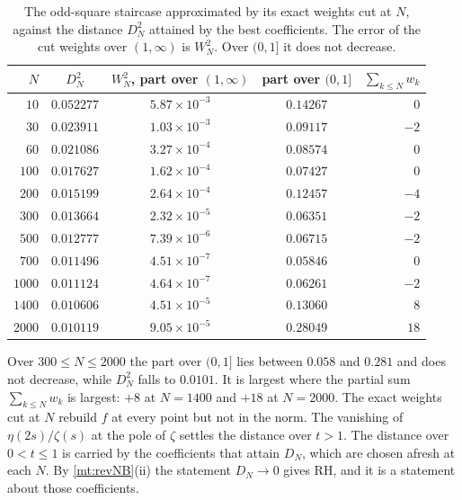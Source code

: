 \documentclass[11pt]{article}
\theoremstyle{definition}\newtheorem{definition}[theorem]{Definition}
\theoremstyle{remark}\newtheorem{remark}[theorem]{Remark}
\theoremstyle{definition}\newtheorem{axiom}{Axiom}
\begin{document}
\begin{table}[!htbp]\centering\small
\begin{tabular}{@{}rcccr@{}}\toprule
$N$ & $D_N^2$ & $W_N^2$, part over $(1,\infty)$ & part over $(0,1]$ & $\sum_{k\le N}w_k$\\\midrule
$10$ & $0.052277$ & $5.87\times10^{-3}$ & $0.14267$ & $0$\\
$30$ & $0.023911$ & $1.03\times10^{-3}$ & $0.09117$ & $-2$\\
$60$ & $0.021086$ & $3.27\times10^{-4}$ & $0.08574$ & $0$\\
$100$ & $0.017627$ & $1.62\times10^{-4}$ & $0.07427$ & $0$\\
$200$ & $0.015199$ & $2.64\times10^{-4}$ & $0.12457$ & $-4$\\
$300$ & $0.013664$ & $2.32\times10^{-5}$ & $0.06351$ & $-2$\\
$500$ & $0.012777$ & $7.39\times10^{-6}$ & $0.06715$ & $-2$\\
$700$ & $0.011496$ & $4.51\times10^{-7}$ & $0.05846$ & $0$\\
$1000$ & $0.011124$ & $4.64\times10^{-7}$ & $0.06261$ & $-2$\\
$1400$ & $0.010606$ & $4.51\times10^{-5}$ & $0.13060$ & $8$\\
$2000$ & $0.010119$ & $9.05\times10^{-5}$ & $0.28049$ & $18$\\\bottomrule
\end{tabular}
\caption{The odd-square staircase approximated by its exact weights cut at $N$, against the distance $D_N^2$ attained by the best coefficients. The error of the cut weights over $(1,\infty)$ is $W_N^2$. Over $(0,1]$ it does not decrease.}\label{tab:exact}
\end{table}

Over $300\le N\le2000$ the part over $(0,1]$ lies between $0.058$ and $0.281$ and does not decrease, while $D_N^2$ falls to $0.0101$. It is largest where the partial sum $\sum_{k\le N}w_k$ is largest: $+8$ at $N=1400$ and $+18$ at $N=2000$. The exact weights cut at $N$ rebuild $f$ at every point but not in the norm. The vanishing of $\eta(2s)/\zeta(s)$ at the pole of $\zeta$ settles the distance over $t>1$. The distance over $0<t\le1$ is carried by the coefficients that attain $D_N$, which are chosen afresh at each $N$. By \cref{mt:revNB}(ii) the statement $D_N\to0$ gives RH, and it is a statement about those coefficients.
\end{document}
